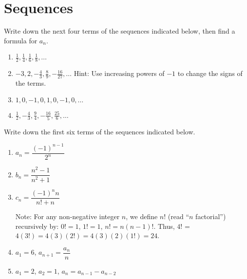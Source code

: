 \documentclass[12pt,letterpaper,fleqn]{article}
\theoremstyle{definition}
\begin{document}
\section*{Sequences}
Write down the next four terms of the sequences indicated below, then find a formula for $a_n$.
\begin{enumerate}
  \item $\frac{1}{2}, \frac{1}{4}, \frac{1}{6}, \frac{1}{8},\ldots$
  \item $-3, 2, -\frac{4}{3}, \frac{8}{9}, -\frac{16}{27},\ldots$ Hint: Use increasing powers of $-1$ to change the signs of the terms.
  \item $1, 0, -1, 0, 1, 0, -1, 0,\ldots$
  \item $\frac{1}{2}, -\frac{4}{3}, \frac{9}{4}, -\frac{16}{5}, \frac{25}{6},\ldots$
\end{enumerate}
Write down the first six terms of the sequences indicated below.
\begin{enumerate}[resume]
  \item $a_n = \dfrac{(-1)^{n-1}}{2^n}$
  \item $b_n = \dfrac{n^2-1}{n^2+1}$
  \item $c_n = \dfrac{(-1)^n n}{n! + n}$

  Note: For any non-negative integer $n$, we define $n!$ (read ``$n$ factorial'') recursively by: $0! = 1$, $1! = 1$, $n! = n(n-1)!$. Thus, $4!$ = $4(3!) = 4(3)(2!) = 4(3)(2)(1!) = 24$.
  \item $a_1 = 6$, $a_{n+1} = \dfrac{a_n}{n}$
  \item $a_1 = 2$, $a_2 = 1$, $a_{n} = a_{n-1} - a_{n-2}$
\end{enumerate}
\end{document}
